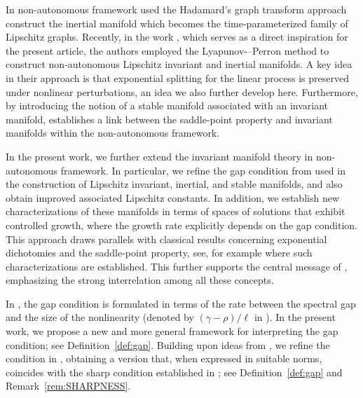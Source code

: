 \documentclass[a4paper,11pt,reqno]{amsart}
\theoremstyle{plain}
\theoremstyle{definition}
\numberwithin{equation}{section}
\begin{document}
In non-autonomous framework \cite{KS02} used the Hadamard's graph transform approach construct the inertial manifold which becomes the time-parameterized family of Lipschitz graphs. Recently, in the work \cite{CLMO-S25}, which serves as a direct inspiration for the present article, the authors employed the Lyapunov-–Perron method to construct non-autonomous Lipschitz invariant and inertial manifolds. A key idea in their approach is that exponential splitting for the linear process is preserved under nonlinear perturbations, an idea we also further develop here. Furthermore, by introducing the notion of a stable manifold associated with an invariant manifold, \cite{CLMO-S25} establishes a link between the saddle-point property and invariant manifolds within the non-autonomous framework.

In the present work, we further extend the invariant manifold theory in non-autonomous framework. In particular, we refine the gap condition from \cite{CLMO-S25} used in the construction of Lipschitz invariant, inertial, and stable manifolds, and also obtain improved associated Lipschitz constants.
In addition, we establish new characterizations of these manifolds in terms of spaces of solutions that exhibit controlled growth, where the growth rate explicitly depends on the gap condition. This approach draws parallels with classical results concerning exponential dichotomies and the saddle-point property, see, for example \cite{CCLO-S-AA-21,Chen-Tan-Hale,Zhou-Lu-Zhang-13} where such characterizations are established. This further supports the central message of \cite{CLMO-S25}, emphasizing the strong interrelation among all these concepts.

In \cite{CLMO-S25}, the gap condition is formulated in terms of the rate between the spectral gap and the size of the nonlinearity (denoted by $(\gamma - \rho)/\ell$ in \cite{CLMO-S25}). In the present work, we propose a new and  more general framework for interpreting the gap condition; see Definition~\ref{def:gap}. Building upon ideas from \cite{CR96,LL99}, we refine the condition in \cite{CLMO-S25}, obtaining a version that, when expressed in suitable norms, coincides with the sharp condition established in \cite{Miklavcic,Romanov}; see Definition~\ref{def:gap} and Remark~\ref{rem:SHARPNESS}.
\end{document}
